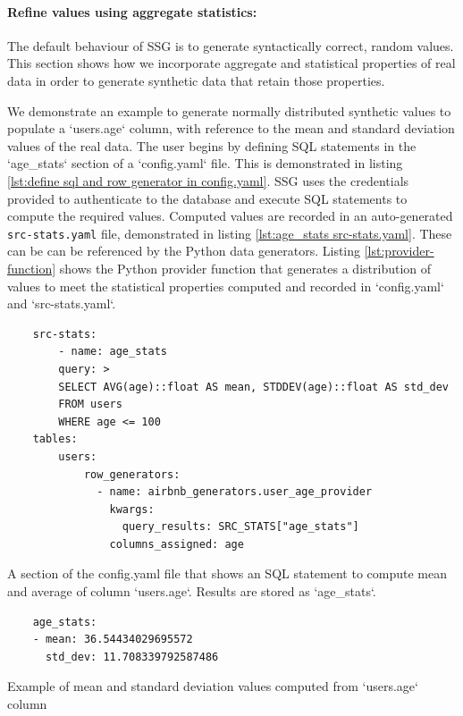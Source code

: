 \documentclass[11pt]{article}
\begin{document}
\paragraph{Refine values using aggregate statistics: }

The default behaviour of SSG is to generate syntactically correct, random values. This section shows how we incorporate aggregate and statistical properties of real data in order to generate synthetic data that retain those properties. 

We demonstrate an example to generate normally distributed synthetic values to populate a `users.age` column, with reference to the mean and standard deviation values of the real data. The user begins by defining SQL statements in the `age\_stats` section of a `config.yaml` file. This is demonstrated in listing \ref{lst:define sql and row generator in config.yaml}. SSG uses the credentials provided to authenticate to the database and execute SQL statements to compute the required values. Computed values are recorded in an auto-generated \texttt{src-stats.yaml} file, demonstrated in listing \ref{lst:age_stats src-stats.yaml}. These can be can be referenced by the Python data generators. Listing \ref{lst:provider-function} shows the Python provider function that generates a distribution of values to meet the statistical properties computed and recorded in `config.yaml` and `src-stats.yaml`.

\begin{listing}[H]
\begin{verbatim}
    src-stats:
        - name: age_stats
        query: >
        SELECT AVG(age)::float AS mean, STDDEV(age)::float AS std_dev
        FROM users
        WHERE age <= 100
    tables:
        users:
            row_generators:
              - name: airbnb_generators.user_age_provider
                kwargs:
                  query_results: SRC_STATS["age_stats"]
                columns_assigned: age
\end{verbatim}
\caption{A section of the config.yaml file that shows an SQL statement to compute mean and average of column `users.age`. Results are stored as `age\_stats`. }
\label{lst:define sql and row generator in config.yaml}
\end{listing}

\begin{listing}[H]
\begin{verbatim}
    age_stats:
    - mean: 36.54434029695572
      std_dev: 11.708339792587486
\end{verbatim}
\caption{Example of mean and standard deviation values computed from `users.age` column}
\label{lst:age_stats src-stats.yaml}
\end{listing}
\end{document}
